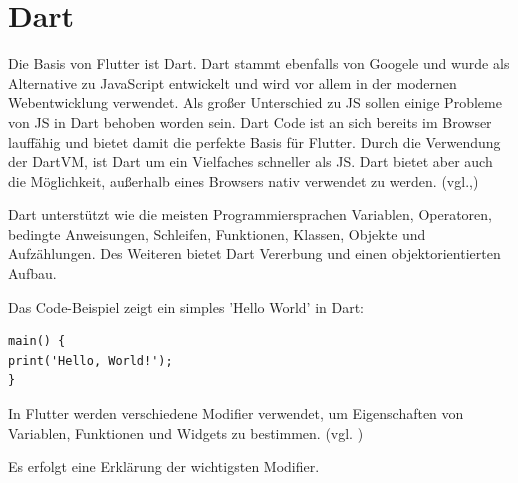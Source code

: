 \section{Dart}
Die Basis von Flutter ist Dart. Dart stammt ebenfalls von Googele und wurde als Alternative zu JavaScript entwickelt und wird vor allem in der modernen Webentwicklung verwendet. Als großer Unterschied zu JS sollen einige Probleme von JS in Dart behoben worden sein. Dart Code ist an sich bereits im Browser lauffähig und bietet damit die perfekte Basis für Flutter. Durch die Verwendung der DartVM, ist Dart um ein Vielfaches schneller als JS. Dart bietet aber auch die Möglichkeit, außerhalb eines Browsers nativ verwendet zu werden. (vgl.\cite{Dart},\cite{Dart-Aufbau})

Dart unterstützt wie die meisten Programmiersprachen Variablen, Operatoren, bedingte Anweisungen, Schleifen, Funktionen, Klassen, Objekte und Aufzählungen. Des Weiteren bietet Dart Vererbung und einen objektorientierten Aufbau.

\newpage

Das Code-Beispiel zeigt ein simples 'Hello World' in Dart:
\begin{lstlisting}[style=flutterListingStyle,caption={Hello World - Dart},label={lst:maindart}]
main() {
print('Hello, World!');
}
\end{lstlisting}



\label{subsec:thero:modifier}
In Flutter werden verschiedene Modifier verwendet, um Eigenschaften von Variablen, Funktionen und Widgets zu bestimmen. (vgl. \cite{modifier})


Es erfolgt eine Erklärung der wichtigsten Modifier.

